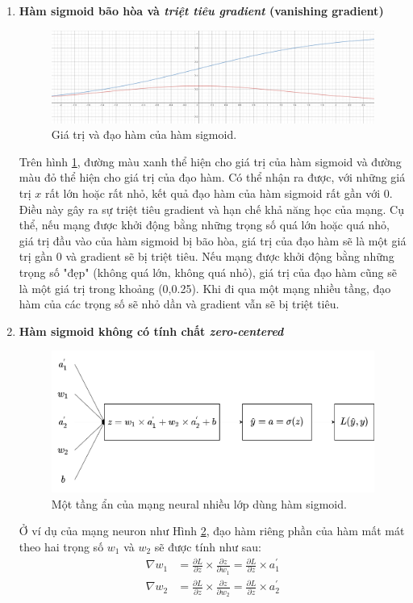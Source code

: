 \begin{enumerate}
    \item \textbf{Hàm sigmoid bão hòa và \textit{triệt tiêu gradient} (vanishing gradient)}
    \begin{figure}[!h]
	\centering
		\includegraphics[width=0.75\columnwidth]{books/artificial-neural-network/chapter03/figure/VanishingGradient.png}
        \caption{Giá trị và đạo hàm của hàm sigmoid.}
        \label{fig:VanishingGradient}
		\centering
    \end{figure}

    Trên hình \ref{fig:VanishingGradient}, đường màu xanh thể hiện cho giá trị của hàm sigmoid và đường màu đỏ thể hiện cho giá trị của đạo hàm. Có thể nhận ra được, với những giá trị $x$ rất lớn hoặc rất nhỏ, kết quả đạo hàm của hàm sigmoid rất gần với 0. Điều này gây ra sự triệt tiêu gradient và hạn chế khả năng học của mạng. Cụ thể, nếu mạng được khởi động bằng những trọng số quá lớn hoặc quá nhỏ, giá trị đầu vào của hàm sigmoid bị bão hòa, giá trị của đạo hàm sẽ là một giá trị gần 0 và gradient sẽ bị triệt tiêu. Nếu mạng được khởi động bằng những trọng số "đẹp" (không quá lớn, không quá nhỏ), giá trị của đạo hàm cũng sẽ là một giá trị trong khoảng (0,0.25). Khi đi qua một mạng nhiều tầng, đạo hàm của các trọng số sẽ nhỏ dần và gradient vẫn sẽ bị triệt tiêu.
    \item \textbf{Hàm sigmoid không có tính chất \textit{zero-centered}}
    \begin{figure}[!h]
	\centering
		\includegraphics[width=0.5\columnwidth]{books/artificial-neural-network/chapter03/figure/ZeroCentered.png}
        \caption{Một tầng ẩn của mạng neural nhiều lớp dùng hàm sigmoid.}
        \label{fig:ZeroCentered}
		\centering
    \end{figure}

    Ở ví dụ của mạng neuron như Hình \ref{fig:ZeroCentered}, đạo hàm riêng phần của hàm mất mát theo hai trọng số $w_1$ và $w_2$ sẽ được tính như sau:
    \begin{align*}
        \nabla w_{1} &= \frac{\partial L}{\partial z} \times \frac{\partial z}{\partial w_1} = \frac{\partial L}{\partial z} \times a^{'}_1\\
        \nabla w_{2} &= \frac{\partial L}{\partial z} \times \frac{\partial z}{\partial w_2} = \frac{\partial L}{\partial z} \times a^{'}_2
    \end{align*}


\end{enumerate}

